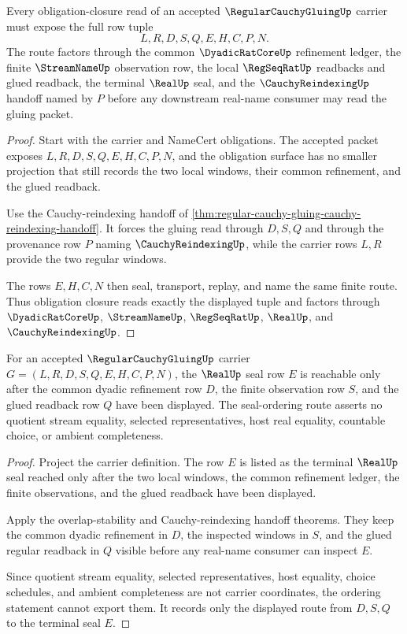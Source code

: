 \begin{theorem}
\label{thm:regular-cauchy-gluing-obligation-closure-handoff}
Every obligation-closure read of an accepted $\RegularCauchyGluingUp$ carrier must expose the full row tuple
$$
L,R,D,S,Q,E,H,C,P,N.
$$
The route factors through the common $\DyadicRatCoreUp$ refinement ledger, the finite $\StreamNameUp$ observation row, the local $\RegSeqRatUp$ readbacks and glued readback, the terminal $\RealUp$ seal, and the $\CauchyReindexingUp$ handoff named by $P$ before any downstream real-name consumer may read the gluing packet.
\end{theorem}
\begin{proof}
Start with the carrier and NameCert obligations. The accepted packet exposes $L,R,D,S,Q,E,H,C,P,N$, and the obligation surface has no smaller projection that still records the two local windows, their common refinement, and the glued readback.

Use the Cauchy-reindexing handoff of \autoref{thm:regular-cauchy-gluing-cauchy-reindexing-handoff}. It forces the gluing read through $D,S,Q$ and through the provenance row $P$ naming $\CauchyReindexingUp$, while the carrier rows $L,R$ provide the two regular windows.

The rows $E,H,C,N$ then seal, transport, replay, and name the same finite route. Thus obligation closure reads exactly the displayed tuple and factors through $\DyadicRatCoreUp$, $\StreamNameUp$, $\RegSeqRatUp$, $\RealUp$, and $\CauchyReindexingUp$.
\end{proof}

\begin{theorem}
\label{thm:regular-cauchy-gluing-real-seal-ordering}
For an accepted $\RegularCauchyGluingUp$ carrier $G=(L,R,D,S,Q,E,H,C,P,N)$, the $\RealUp$ seal row $E$ is reachable only after the common dyadic refinement row $D$, the finite observation row $S$, and the glued readback row $Q$ have been displayed. The seal-ordering route asserts no quotient stream equality, selected representatives, host real equality, countable choice, or ambient completeness.
\end{theorem}
\begin{proof}
Project the carrier definition. The row $E$ is listed as the terminal $\RealUp$ seal reached only after the two local windows, the common refinement ledger, the finite observations, and the glued readback have been displayed.

Apply the overlap-stability and Cauchy-reindexing handoff theorems. They keep the common dyadic refinement in $D$, the inspected windows in $S$, and the glued regular readback in $Q$ visible before any real-name consumer can inspect $E$.

Since quotient stream equality, selected representatives, host equality, choice schedules, and ambient completeness are not carrier coordinates, the ordering statement cannot export them. It records only the displayed route from $D,S,Q$ to the terminal seal $E$.
\end{proof}

